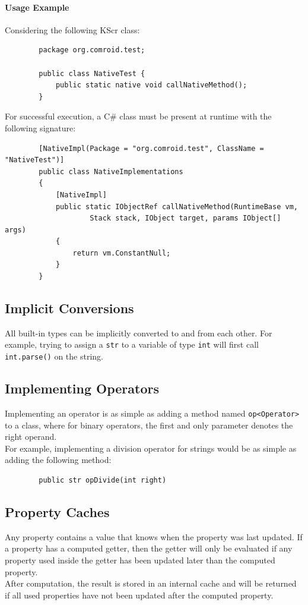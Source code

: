 \documentclass{docs}
\begin{document}
    \paragraph{Usage Example} Considering the following KScr class:
    \begin{verbatim}
        package org.comroid.test;

        public class NativeTest {
            public static native void callNativeMethod();
        }
    \end{verbatim}
    For successful execution, a C\# class must be present at runtime with the following signature:
    \begin{verbatim}
        [NativeImpl(Package = "org.comroid.test", ClassName = "NativeTest")]
        public class NativeImplementations
        {
            [NativeImpl]
            public static IObjectRef callNativeMethod(RuntimeBase vm,
                    Stack stack, IObject target, params IObject[] args)
            {
                return vm.ConstantNull;
            }
        }
    \end{verbatim}

    \subsection{Implicit Conversions}
    All built-in types can be implicitly converted to and from each other.
    For example, trying to assign a \texttt{str} to a variable of type \texttt{int} will first call \texttt{int.parse()} on the string.

    \subsection{Implementing Operators}
    Implementing an operator is as simple as adding a method named \texttt{op<Operator>} to a class, where for binary operators, the first and only parameter denotes the right operand. \\
    For example, implementing a division operator for strings would be as simple as adding the following method:
    \begin{verbatim}
        public str opDivide(int right)
    \end{verbatim}

    \subsection{Property Caches}
    Any property contains a value that knows when the property was last updated.
    If a property has a computed getter, then the getter will only be evaluated if any property used inside the getter has been updated later than the computed property. \\
    After computation, the result is stored in an internal cache and will be returned if all used properties have not been updated after the computed property.
\end{document}
